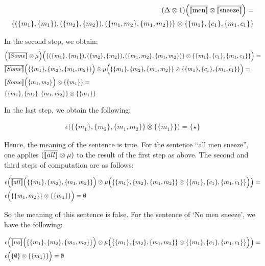 \begin{align*}
(\Delta \otimes 1)\Big(\overline{[\![ \text{men} ]\!]} \otimes \overline{[\![ \text{sneeze} ]\!]}\Big) =&\\
  \{(\{m_1\}, \{m_1\}), (\{m_2\}, \{m_2\}), (\{m_1, m_2\}, \{m_1, m_2\}) \} \otimes  \{\{m_1\}, \{c_1\}, \{m_1, c_1\}\} 
\end{align*}

\noindent
In the second step, we obtain:
\begin{align*}
&\Big(\overline{[\![ Some ]\!]} \otimes \mu\Big) \Big ( \{(\{m_1\}, \{m_1\}), (\{m_2\}, \{m_2\}), (\{m_1, m_2\}, \{m_1, m_2\}) \} \otimes  \{\{m_1\}, \{c_1\}, \{m_1, c_1\}\}  \Big) =\\
&\overline{[\![ Some ]\!]}\Big (\{\{m_1\}, \{m_2\}, \{m_1, m_2\}\} \Big) \otimes \mu \Big( \{\{m_1\}, \{m_2\}, \{m_1, m_2\}\}  \otimes \{\{m_1\}, \{c_1\}, \{m_1, c_1\}\} \Big)=\\
&{[\![ Some ]\!]}\Big (\{m_1, m_2\} \Big) \otimes\{\{m_1\}\}=\\
&\{\{m_1\}, \{m_2\}, \{m_1, m_2\}\}  \otimes \{\{m_1\}\}
\end{align*}

\noindent
In the last step, we obtain the following:

\begin{align*}
\epsilon\Big(\{\{m_1\}, \{m_2\}, \{m_1, m_2\}\}  \otimes \{\{m_1\}\}\Big) = \{\star\}
\end{align*}

\noindent
Hence, the meaning of the sentence is true.  For the sentence ``all men sneeze'',  one applies $(\overline{[\![ all ]\!]} \otimes \mu)$ to the result of the first step as above. The second and third steps of computation are as follows:

\begin{align*}
&\epsilon   \Big(\overline{[\![ all ]\!]}\Big ( \{\{m_1\}, \{m_2\}, \{m_1, m_2\}\} \Big) \otimes \mu \Big( \{\{m_1\}, \{m_2\}, \{m_1, m_2\}\}  \otimes \{\{m_1\}, \{c_1\}, \{m_1, c_1\}\} \Big)  \Big) =\\
&\epsilon \Big(\{\{m_1, m_2\}\}  \otimes \{\{m_1\}\}\Big) = \emptyset
\end{align*}

\noindent
So the meaning of this sentence is false.   For the sentence of `No men sneeze',  we have the following:

\begin{align*}
&\epsilon   \Big(\overline{[\![ no ]\!]}\Big ( \{\{m_1\}, \{m_2\}, \{m_1, m_2\}\} \Big) \otimes \mu \Big( \{\{m_1\}, \{m_2\}, \{m_1, m_2\}\}  \otimes \{\{m_1\}, \{c_1\}, \{m_1, c_1\}\} \Big)  \Big) =\\
&\epsilon \Big(\{\emptyset\}  \otimes \{\{m_1\}\}\Big) = \emptyset
\end{align*}


